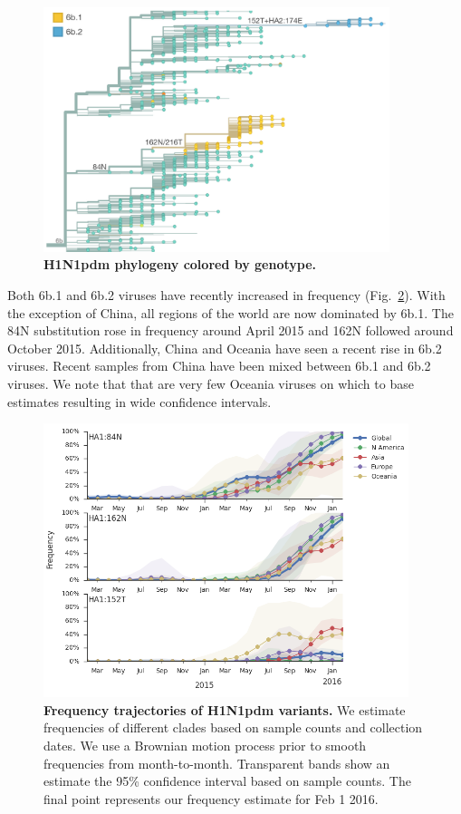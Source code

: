 \documentclass[11pt,oneside,letterpaper]{article}
\begin{document}
\begin{figure}[H]
	\centering		
	\includegraphics[width=0.9\textwidth]{../figures/feb-2016/H1N1pdm_tree.png}
	\caption{\textbf{H1N1pdm phylogeny colored by genotype.}
	}
	\label{H1N1pdm_tree}
\end{figure}

\pagebreak

Both 6b.1 and 6b.2 viruses have recently increased in frequency (Fig.\ \ref{H1N1pdm_mutations}). With the exception of China, all regions of the world are now dominated by 6b.1. The 84N substitution rose in frequency around April 2015 and 162N followed around October 2015. Additionally, China and Oceania have seen a recent rise in 6b.2 viruses. Recent samples from China have been mixed between 6b.1 and 6b.2 viruses. We note that that are very few Oceania viruses on which to base estimates resulting in wide confidence intervals.

\begin{figure}[H]
	\centering		
	\includegraphics[width=0.95\textwidth]{../figures/feb-2016/H1N1pdm_mutations.png}
	\caption{\textbf{Frequency trajectories of H1N1pdm variants.}
	We estimate frequencies of different clades based on sample counts and collection dates.
	We use a Brownian motion process prior to smooth frequencies from month-to-month.
	Transparent bands show an estimate the 95\% confidence interval based on sample counts.
	The final point represents our frequency estimate for Feb 1 2016.	
	}
	\label{H1N1pdm_mutations}
\end{figure}
\end{document}
